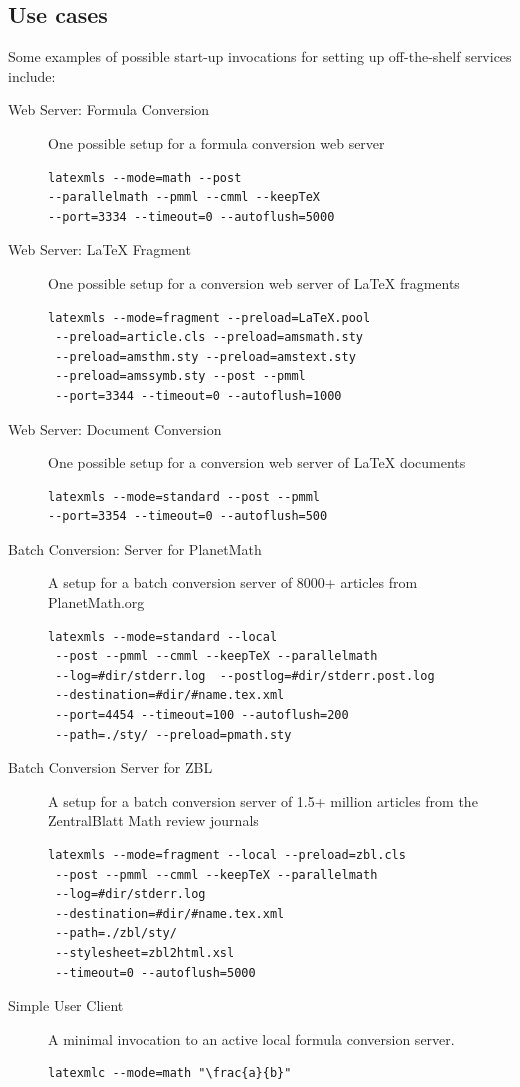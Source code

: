 \documentclass{book}
\begin{document}
\subsection{Use cases}\label{usacases.daemon}
Some examples of possible start-up invocations for setting up off-the-shelf services include:
\begin{description}
\item[Web Server: Formula Conversion] One possible setup for a formula conversion web server\\
\begin{lstlisting}[style=shell]
latexmls --mode=math --post 
--parallelmath --pmml --cmml --keepTeX 
--port=3334 --timeout=0 --autoflush=5000
\end{lstlisting}
\item[Web Server: LaTeX Fragment] One possible setup for a conversion web server of {\LaTeX} fragments\\
\begin{lstlisting}[style=shell]
latexmls --mode=fragment --preload=LaTeX.pool 
 --preload=article.cls --preload=amsmath.sty 
 --preload=amsthm.sty --preload=amstext.sty
 --preload=amssymb.sty --post --pmml 
 --port=3344 --timeout=0 --autoflush=1000
\end{lstlisting}
\item[Web Server: Document Conversion] One possible setup for a conversion web server of {\LaTeX} documents\\
\begin{lstlisting}[style=shell]
latexmls --mode=standard --post --pmml  
--port=3354 --timeout=0 --autoflush=500
\end{lstlisting}
\item[Batch Conversion: Server for PlanetMath] A setup for a batch conversion server of 8000+ articles from PlanetMath.org\\
\begin{lstlisting}[style=shell]
latexmls --mode=standard --local
 --post --pmml --cmml --keepTeX --parallelmath
 --log=#dir/stderr.log  --postlog=#dir/stderr.post.log
 --destination=#dir/#name.tex.xml
 --port=4454 --timeout=100 --autoflush=200
 --path=./sty/ --preload=pmath.sty
\end{lstlisting}
\item[Batch Conversion Server for ZBL] A setup for a batch conversion server of 1.5+ million articles from the ZentralBlatt Math review journals\\
\begin{lstlisting}[style=shell]
latexmls --mode=fragment --local --preload=zbl.cls
 --post --pmml --cmml --keepTeX --parallelmath
 --log=#dir/stderr.log
 --destination=#dir/#name.tex.xml 
 --path=./zbl/sty/
 --stylesheet=zbl2html.xsl
 --timeout=0 --autoflush=5000
\end{lstlisting}
\item[Simple User Client] A minimal invocation to an active local formula conversion server.
\begin{lstlisting}[style=shell]
latexmlc --mode=math "\frac{a}{b}"
\end{lstlisting}
\end{description}
\end{document}
